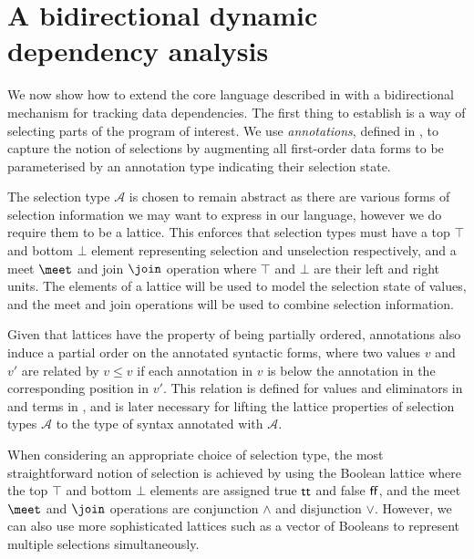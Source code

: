 \section{A bidirectional dynamic dependency analysis}
\label{sec:data-dependencies}

We now show how to extend the core language described in  with a bidirectional mechanism for tracking data dependencies. The first thing to establish is a way of selecting parts of the program of interest. We use \textit{annotations}, defined in , to capture the notion of selections by augmenting all first-order data forms to be parameterised by an annotation type indicating their selection state.

The selection type $\mathcal{A}$ is chosen to remain abstract as there are various forms of selection information we may want to express in our language, however we do require them to be a lattice. This enforces that selection types must have a top $\top$ and bottom $\bot$ element representing selection and unselection respectively, and a meet $\meet$ and join $\join$ operation where $\top$ and $\bot$ are their left and right units. The elements of a lattice will be used to model the selection state of values, and the meet and join operations will be used to combine selection information.

Given that lattices have the property of being partially ordered, annotations also induce a partial order on the annotated syntactic forms, where two values $v$ and $v'$ are related by $v \leq v$ if each annotation in $v$ is below the annotation in the corresponding position in $v'$. This relation is defined for values and eliminators in  and terms in , and is later necessary for lifting the lattice properties of selection types $\mathcal{A}$ to the type of syntax annotated with $\mathcal{A}$.

When considering an appropriate choice of selection type, the most straightforward notion of selection is achieved by using the Boolean lattice where the top $\top$ and bottom $\bot$ elements are assigned true $\mathsf{tt}$ and false $\mathsf{ff}$, and the meet $\meet$ and $\join$ operations are conjunction $\land$ and disjunction $\lor$. However, we can also use more sophisticated lattices such as a vector of Booleans to represent multiple selections simultaneously.





